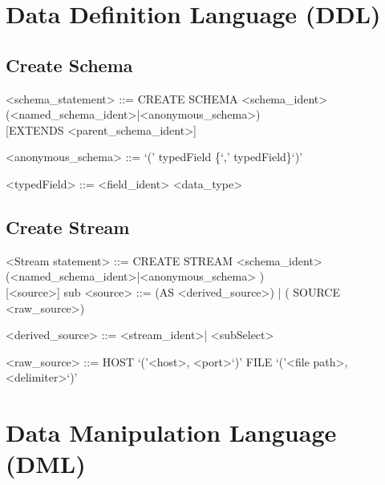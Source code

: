 \documentclass{article}
\begin{document}
\section{Data Definition Language (DDL)}
\subsection{Create Schema}

\setlength{\grammarindent}{12em} %

\begin{grammar}

<schema_statement> ::= CREATE SCHEMA <schema_ident> \\
(<named_schema_ident>|<anonymous_schema>) \\
  { }[EXTENDS <parent_schema_ident>]

<anonymous_schema> ::= `(' typedField \{`,' typedField\}`)'

<typedField> ::= <field_ident> <data_type>

\end{grammar}
	
	




\subsection{Create Stream}
	
					
\begin{grammar}
<Stream statement> ::= CREATE STREAM <schema_ident> \\		(<named_schema_ident>|<anonymous_schema> ) \\
{ }[<source>]
sub
<source> ::= (AS <derived_source>) | ( SOURCE <raw_source>)

<derived_source> ::=  <stream_ident>| <subSelect>

<raw_source> ::= 
				HOST `('<host>, <port>`)'
					\alt FILE `('<file path>, <delimiter>`)'
\end{grammar}


\section{Data Manipulation Language (DML)}
\end{document}
